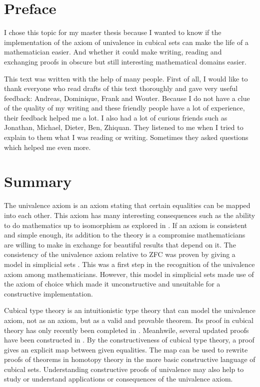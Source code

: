 \documentclass[11pt,a4paper,twoside,xetex,draft]{book}
\begin{document}
\setcounter{page}{0}

\chapter*{Preface}

I chose this topic for my master thesis because I wanted to know if the implementation of the axiom of univalence in cubical sets can make the life of a mathematician easier. And whether it could make writing, reading and exchanging proofs in obscure but still interesting mathematical domains easier.

This text was written with the help of many people. First of all, I would like to thank everyone who read drafts of this text thoroughly and gave very useful feedback: Andreas, Dominique, Frank and Wouter. Because I do not have a clue of the quality of my writing and these friendly people have a lot of experience, their feedback helped me a lot. I also had a lot of curious friends such as Jonathan, Michael, Dieter, Ben, Zhiquan.  They listened to me when I tried to explain to them what I was reading or writing. Sometimes they asked questions which helped me even more.

\chapter*{Summary}


The univalence axiom is an axiom stating that certain equalities can be mapped into each other. This axiom has many interesting consequences such as the ability to do mathematics up to isomorphism as explored in \cite{Voevodsky2013}. If an axiom is consistent and simple enough, its addition to the theory is a compromise mathematicians are willing to make in exchange for beautiful results that depend on it. The  consistency of the univalence axiom relative to ZFC was proven by giving a model in simplicial sets \cite{Kapulkin2012}. This was a first step in the recognition of the univalence axiom among mathematicians. However, this model in simplicial sets made use of the axiom of choice which made it unconstructive and unsuitable for a constructive implementation.

Cubical type theory is an intuitionistic type theory that can model the univalence axiom, not as an axiom, but as a valid and provable theorem. Its proof in cubical theory has only recently been completed in \cite{Cohen2016}. Meanhwile, several updated proofs have been constructed in \cite{Sterling2018b, Moertberg2018}. By the constructiveness of cubical type theory, a proof gives an explicit map between given equalities. The map can be used to rewrite proofs of theorems in homotopy theory in the more basic constructive language of cubical sets. Understanding constructive proofs of univalence may also help to study or understand applications or consequences of the univalence axiom.
\end{document}
